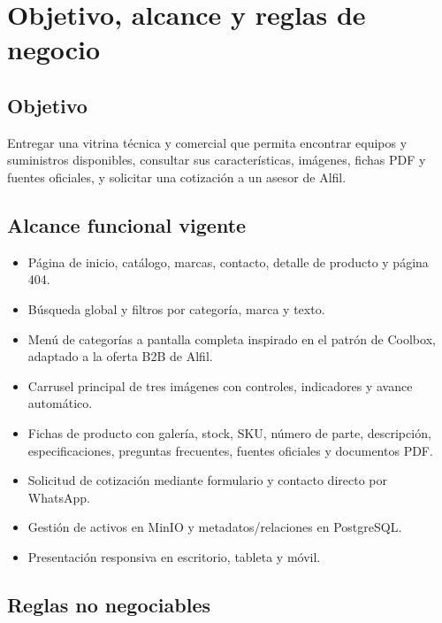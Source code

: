 \documentclass[11pt,a4paper]{article}
\begin{document}
\section{Objetivo, alcance y reglas de negocio}

\subsection{Objetivo}

Entregar una vitrina técnica y comercial que permita encontrar equipos y suministros disponibles, consultar sus características, imágenes, fichas PDF y fuentes oficiales, y solicitar una cotización a un asesor de Alfil.

\subsection{Alcance funcional vigente}

\begin{itemize}
  \item Página de inicio, catálogo, marcas, contacto, detalle de producto y página 404.
  \item Búsqueda global y filtros por categoría, marca y texto.
  \item Menú de categorías a pantalla completa inspirado en el patrón de Coolbox, adaptado a la oferta B2B de Alfil.
  \item Carrusel principal de tres imágenes con controles, indicadores y avance automático.
  \item Fichas de producto con galería, stock, SKU, número de parte, descripción, especificaciones, preguntas frecuentes, fuentes oficiales y documentos PDF.
  \item Solicitud de cotización mediante formulario y contacto directo por WhatsApp.
  \item Gestión de activos en MinIO y metadatos/relaciones en PostgreSQL.
  \item Presentación responsiva en escritorio, tableta y móvil.
\end{itemize}

\subsection{Reglas no negociables}
\end{document}
